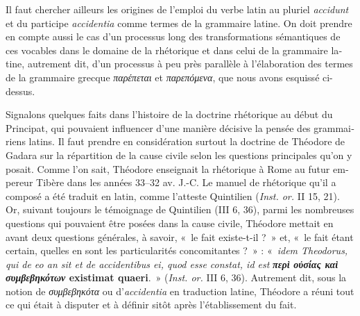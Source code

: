 \documentclass[output=paper]{langsci/langscibook}
\begin{document}
\begin{otherlanguage}{french}
Il faut chercher ailleurs les origines de l’emploi du verbe latin au pluriel \textit{accidunt} et du participe \textit{accidentia} comme termes de la grammaire latine. On doit prendre en compte aussi le cas d’un processus long des transformations sémantiques de ces vocables dans le domaine de la rhétorique et dans celui de la grammaire latine, autrement dit, d’un processus à peu près parallèle à l’élaboration des termes de la grammaire grecque \textit{παρέπεται} et \textit{παρεπόμενα}, que nous avons esquissé ci-dessus.

Signalons quelques faits dans l’histoire de la doctrine rhétorique au début du Principat, qui pouvaient influencer d’une manière décisive la pensée des grammairiens latins. Il faut prendre en considération surtout la doctrine de Théodore de Gadara sur la répartition de la cause civile selon les questions principales qu’on y posait. Comme l’on sait, Théodore enseignait la rhétorique à Rome au futur empereur Tibère dans les années 33–32 av. J.-C. Le manuel de rhétorique qu’il a composé a été traduit en latin, comme l’atteste Quintilien (\textit{Inst. or.} II 15, 21). Or, suivant toujours le témoignage de Quintilien (III 6, 36), parmi les nombreuses questions qui pouvaient être posées dans la cause civile, Théodore mettait en avant deux questions générales, à savoir, «~le fait existe-t-il ?~» et, «~le fait étant certain, quelles en sont les particularités concomitantes ?~» : «~\textit{idem Theodorus, qui de eo an sit et de accidentibus ei, quod esse constat, id est} \textbf{\textit{περὶ οὐσίας καὶ συμβεβηκότων} existimat quaeri}.~» (\textit{Inst. or.} III 6, 36). Autrement dit, sous la notion de \textit{συμβεβηκότα} ou d’\textit{accidentia} en traduction latine, Théodore a réuni tout ce qui était à disputer et à définir sitôt après l’établissement du fait.


\end{otherlanguage}
\end{document}
